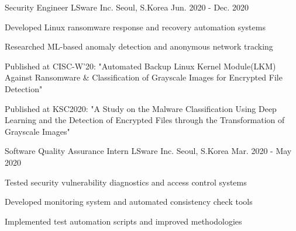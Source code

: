 \begin{cventries}
\cventry
    {Security Engineer} %
    {LSware Inc.} %
    {Seoul, S.Korea} %
    {Jun. 2020 - Dec. 2020} %
    {
      \begin{cvitems} %
        \item {Developed Linux ransomware response and recovery automation systems}
        \item {Researched ML-based anomaly detection and anonymous network tracking}
        \item {Published at CISC-W'20: "Automated Backup Linux Kernel Module(LKM) Against Ransomware \& Classification of Grayscale Images for Encrypted File Detection"}
        \item {Published at KSC2020: "A Study on the Malware Classification Using Deep Learning and the Detection of Encrypted Files through the Transformation of Grayscale Images"}
      \end{cvitems}
    }

\cventry
    {Software Quality Assurance Intern} %
    {LSware Inc.} %
    {Seoul, S.Korea} %
    {Mar. 2020 - May 2020} %
    {
      \begin{cvitems} %
        \item {Tested security vulnerability diagnostics and access control systems}
        \item {Developed monitoring system and automated consistency check tools}
        \item {Implemented test automation scripts and improved methodologies}
      \end{cvitems}
    }

\end{cventries}